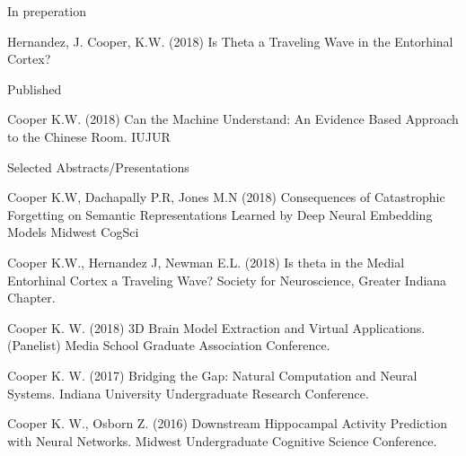 \begin{cvpubentries}


\iftrue
  \cvpubentry
    {In preperation} %
    { } %
    { } %
    { } %
    {
      \begin{cvpubitems} %
        \item {Hernandez, J. Cooper, K.W. (2018) Is Theta a Traveling Wave in the Entorhinal Cortex?}
      \end{cvpubitems}
    }
\fi

\iffalse
  \cvpubentry
    {In press} %
    {} %
    {} %
    {} %
    {
      \begin{cvpubitems} %
        \item {pub}
      \end{cvpubitems}
    }
\fi

  \cvpubentry
    {Published} %
    {} %
    {} %
    {} %
    {
      \begin{cvpubitems} %
        \item {Cooper K.W. (2018) Can the Machine Understand: An Evidence Based Approach to the Chinese Room. IUJUR}
      \end{cvpubitems}
    }
\iffalse %
\fi

\cvpubentry
    {Selected Abstracts/Presentations} %
    {} %
    {} %
    {} %
    {
      \begin{cvpubitems} %
        \item {Cooper K.W, Dachapally P.R, Jones M.N (2018) Consequences of Catastrophic Forgetting on Semantic Representations Learned by Deep Neural Embedding Models Midwest CogSci}
	\item{Cooper K.W., Hernandez J, Newman E.L. (2018) Is theta in the Medial Entorhinal Cortex a Traveling Wave? Society for Neuroscience, Greater Indiana Chapter.}
	\item{Cooper K. W. (2018) 3D Brain Model Extraction and Virtual Applications. (Panelist) Media School Graduate Association Conference.}
	\item{Cooper K. W. (2017) Bridging the Gap: Natural Computation and Neural Systems. Indiana University Undergraduate Research Conference.}
	\item{Cooper K. W., Osborn Z. (2016) Downstream Hippocampal Activity Prediction with Neural Networks. Midwest Undergraduate Cognitive Science Conference.}
      \end{cvpubitems}
    }

\end{cvpubentries}
